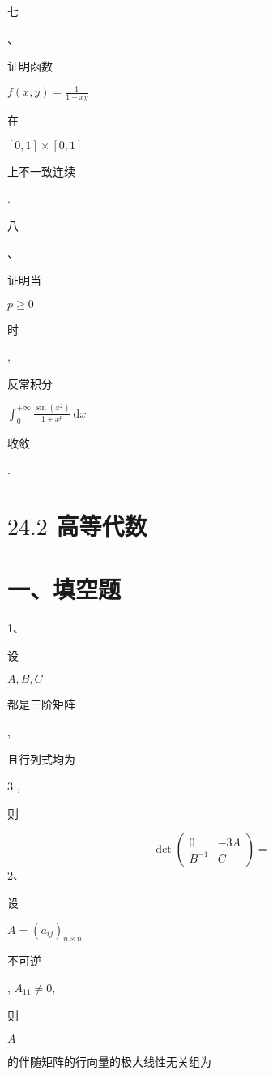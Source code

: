 \documentclass[10pt]{article}
\begin{document}
\begin{CJK}{UTF8}{mj}七\end{CJK}、\begin{CJK}{UTF8}{mj}证明函数\end{CJK} $f(x, y)=\frac{1}{1-x y}$ \begin{CJK}{UTF8}{mj}在\end{CJK} $[0,1] \times[0,1]$ \begin{CJK}{UTF8}{mj}上不一致连续\end{CJK}.

\begin{CJK}{UTF8}{mj}八\end{CJK}、\begin{CJK}{UTF8}{mj}证明当\end{CJK} $p \geq 0$ \begin{CJK}{UTF8}{mj}时\end{CJK}, \begin{CJK}{UTF8}{mj}反常积分\end{CJK} $\int_{0}^{+\infty} \frac{\sin \left(x^{2}\right)}{1+x^{p}} \mathrm{~d} x$ \begin{CJK}{UTF8}{mj}收敛\end{CJK}.

\section{$24.2$ 高等代数}
\section{一、填空题}
1、\begin{CJK}{UTF8}{mj}设\end{CJK} $A, B, C$ \begin{CJK}{UTF8}{mj}都是三阶矩阵\end{CJK}, \begin{CJK}{UTF8}{mj}且行列式均为\end{CJK} 3 , \begin{CJK}{UTF8}{mj}则\end{CJK}
$$
\operatorname{det}\left(\begin{array}{cc}
0 & -3 A \\
B^{-1} & C
\end{array}\right)=
$$
2、\begin{CJK}{UTF8}{mj}设\end{CJK} $A=\left(a_{i j}\right)_{n \times n}$ \begin{CJK}{UTF8}{mj}不可逆\end{CJK}, $A_{11} \neq 0$, \begin{CJK}{UTF8}{mj}则\end{CJK} $A$ \begin{CJK}{UTF8}{mj}的伴随矩阵的行向量的极大线性无关组为\end{CJK}
\end{document}
